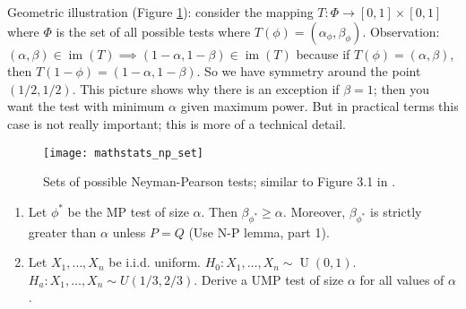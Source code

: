 Geometric illustration (Figure \ref{mathstats.fig.np.sets}): consider the mapping \(T: \Phi \to [0,1] \times [0,1]\) where \(\Phi\) is the set of all possible tests where \(T(\phi) = (\alpha_\phi, \beta_\phi)\). Observation: \((\alpha, \beta) \in \operatorname{im}(T) \implies (1 - \alpha, 1 - \beta) \in \operatorname{im}(T)\) because if \(T(\phi) = (\alpha, \beta)\), then \( T(1 - \phi) = (1 - \alpha, 1 - \beta)\). So we have symmetry around the point \((1/2, 1/2)\). This picture shows why there is an exception if \(\beta = 1\); then you want the test with minimum \(\alpha\) given maximum power. But in practical terms this case is not really important; this is more of a technical detail.

\begin{figure}[htbp]
\begin{center}
\texttt{[image: mathstats\_np\_set]}
\caption{Sets of possible Neyman-Pearson tests; similar to Figure 3.1 in \citet{lehmann2005testing}.}
\label{mathstats.fig.np.sets}
\end{center}
\end{figure}

\begin{exercise}

\begin{enumerate}

\item Let \(\phi^*\) be the MP test of size \(\alpha\). Then \(\beta_{\phi^*} \geq \alpha\). Moreover, \(\beta_{\phi^*}\) is strictly greater than \(\alpha\) unless \(P = Q\) (Use N-P lemma, part 1). 

\item Let \(X_1, \ldots, X_n\) be i.i.d. uniform. \(H_0: X_1, \ldots, X_n \sim \operatorname{U}(0,1)\). \(H_a: X_1, \ldots, X_n \sim U(1/3, 2/3)\). Derive a UMP test of size \(\alpha\) for all values of \(\alpha\).

\end{enumerate}

\end{exercise}

